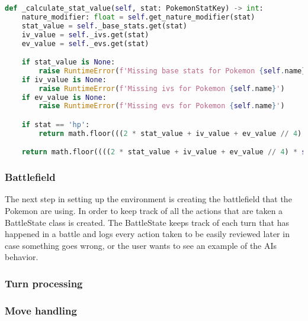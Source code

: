 \begin{lstlisting}[language=Python,caption={Function for calculating a Pokemon's stats},float=tb,label=lst:stat-calc,breaklines]
def _calculate_stat_value(self, stat: PokemonStatKey) -> int:
    nature_modifier: float = self.get_nature_modifier(stat)
    stat_value = self._base_stats.get(stat)
    iv_value = self._ivs.get(stat)
    ev_value = self._evs.get(stat)

    if stat_value is None:
        raise RuntimeError(f'Missing base stats for Pokemon {self.name}')
    if iv_value is None:
        raise RuntimeError(f'Missing ivs for Pokemon {self.name}')
    if ev_value is None:
        raise RuntimeError(f'Missing evs for Pokemon {self.name}')

    if stat == 'hp':
        return math.floor(((2 * stat_value + iv_value + ev_value // 4) * self.level // 100) + self.level + 10)

    return math.floor((((2 * stat_value + iv_value + ev_value // 4) * self.level // 100) + 5) * nature_modifier)
\end{lstlisting}

\subsubsection{Battlefield}
The next step in setting up the environment is creating the battlefield that the Pokemon are using. In order to keep track
of all the actions that are taken a BattleState class is created. The BattleState keeps track of each turn that has happened 
in a battle and logs every action taken to be easily reviewed later in case something goes wrong, or the user wants to see
an example of the AIs behavior. 

\subsubsection{Turn processing}


\subsubsection{Move handling}
